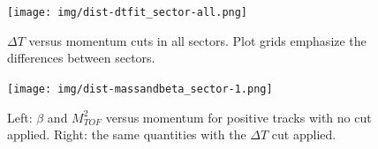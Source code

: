 \begin{figure}[ht]
	\centering
		\texttt{[image: img/dist-dtfit\_sector-all.png]}
		\caption{$\Delta T$ versus momentum cuts in all sectors. Plot grids
					emphasize the differences between sectors.}
		\label{fig:dt_vs_mom_all_sectors}
\end{figure}







\begin{figure}[ht]
	\centering
		\texttt{[image: img/dist-massandbeta\_sector-1.png]}
		\caption{Left: $\beta$ and $M_{TOF}^2$ versus momentum for positive
					tracks with no cut applied. Right: the same quantities with the
					$\Delta T$ cut applied.}
		\label{fig:mass_beta_vs_p_sect5}
\end{figure}



\clearpage







